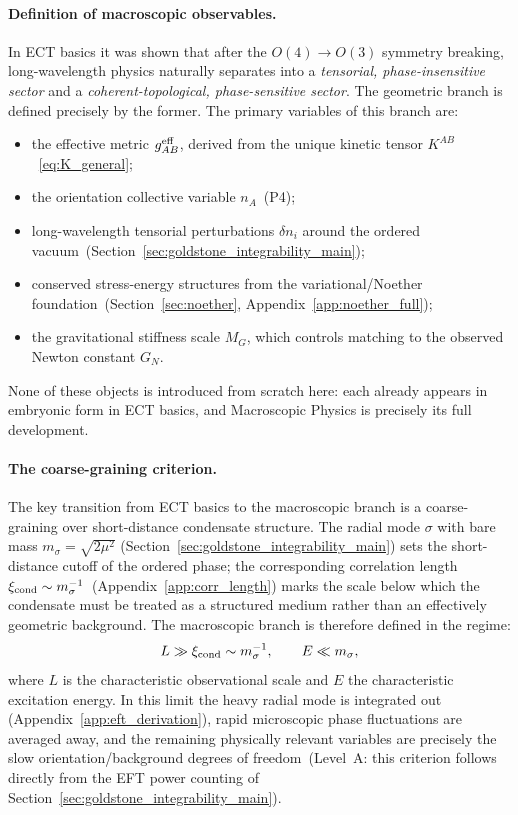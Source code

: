 \documentclass[11pt,a4paper]{article}
\numberwithin{equation}{section}
\begin{document}
\paragraph{Definition of macroscopic observables.}
In ECT basics it was shown that after the $O(4)\to O(3)$
symmetry breaking, long-wavelength physics naturally separates
into a \emph{tensorial, phase-insensitive sector} and a
\emph{coherent-topological, phase-sensitive sector}.
The geometric branch is defined precisely by the former.
The primary variables of this branch are:
\begin{itemize}
  \item the effective metric $g^{\rm eff}_{AB}$, derived from the
    unique kinetic tensor $K^{AB}$~\eqref{eq:K_general};
  \item the orientation collective variable $n_A$~(P4);
  \item long-wavelength tensorial perturbations $\delta n_i$
    around the ordered vacuum~(Section~\ref{sec:goldstone_integrability_main});
  \item conserved stress-energy structures from the
    variational/Noether foundation~(Section~\ref{sec:noether},
    Appendix~\ref{app:noether_full});
  \item the gravitational stiffness scale $M_G$, which controls
    matching to the observed Newton constant $G_N$.
\end{itemize}
None of these objects is introduced from scratch here: each
already appears in embryonic form in ECT basics, and Macroscopic
Physics is precisely its full development.

\paragraph{The coarse-graining criterion.}
The key transition from ECT basics to the macroscopic branch is
a coarse-graining over short-distance condensate structure.
The radial mode $\sigma$ with bare mass $m_\sigma=\sqrt{2\mu^2}$
(Section~\ref{sec:goldstone_integrability_main}) sets the short-distance cutoff
of the ordered phase; the corresponding correlation length
$\xi_{\rm cond}\sim m_\sigma^{-1}$~(Appendix~\ref{app:corr_length})
marks the scale below which the condensate must be treated as a
structured medium rather than an effectively geometric background.
The macroscopic branch is therefore defined in the regime:
\begin{equation}
  \label{eq:macro_regime}
  L \gg \xi_{\rm cond}\sim m_\sigma^{-1},
  \qquad
  E \ll m_\sigma,
\end{equation}
where $L$ is the characteristic observational scale and $E$
the characteristic excitation energy.
In this limit the heavy radial mode is integrated out
(Appendix~\ref{app:eft_derivation}), rapid microscopic
phase fluctuations are averaged away, and the remaining
physically relevant variables are precisely the slow
orientation/background degrees of freedom~(Level~A:
this criterion follows directly from the EFT power counting
of Section~\ref{sec:goldstone_integrability_main}).
\end{document}
